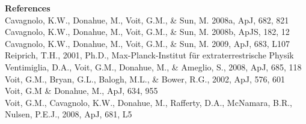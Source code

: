 \documentclass[12pt]{cv}
\begin{document}

{\textbf{References}}\\
Cavagnolo, K.W., Donahue, M., Voit, G.M., \& Sun, M. 2008a, ApJ, 682, 821\\
Cavagnolo, K.W., Donahue, M., Voit, G.M., \& Sun, M. 2008b, ApJS, 182, 12\\
Cavagnolo, K.W., Donahue, M., Voit, G.M., \& Sun, M. 2009, ApJ, 683, L107\\
Reiprich, T.H., 2001, Ph.D., Max-Planck-Institut f{\"u}r extraterrestrische Physik\\
Ventimiglia, D.A., Voit, G.M., Donahue, M., \& Ameglio, S., 2008, ApJ, 685, 118\\
Voit, G.M., Bryan, G.L., Balogh, M.L., \& Bower, R.G., 2002, ApJ, 576, 601\\
Voit, G.M \& Donahue, M., ApJ, 634, 955\\
Voit, G.M., Cavagnolo, K.W., Donahue, M., Rafferty, D.A., McNamara, B.R., Nulsen, P.E.J., 2008, ApJ, 681, L5
\end{document}
